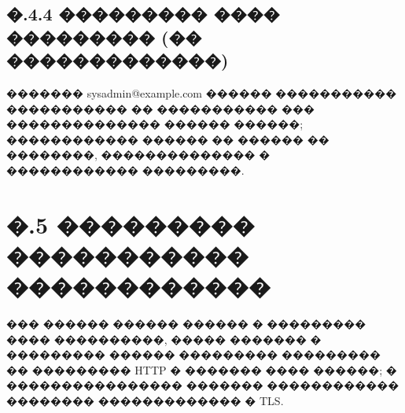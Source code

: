 \subsection*{�.4.4 ��������� ���� ��������� (�� �������������)}

������� sysadmin@example.com ������ ����������� ����������� �� ����������� ��� �������������� ������ ������; ������������ ������ �� ������ �� ��������, �������������� � ������������ ���������.

\section*{�.5 ��������� ����������� ������������}

��� ������ ������ ������ � ��������� ���� ����������, ����� ������� � ��������� ������ ��������� ��������� �� ��������� HTTP � ������� ���� ������; � ���������������� ������� ������������ �������� ������������� � TLS.
